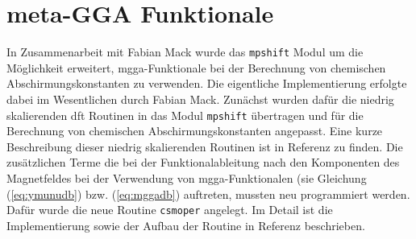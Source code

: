 \section{meta-GGA Funktionale}
In Zusammenarbeit mit Fabian Mack wurde das \texttt{mpshift} Modul um die Möglichkeit erweitert, \ac{mgga}-Funktionale bei der Berechnung von chemischen Abschirmungskonstanten zu verwenden. Die eigentliche Implementierung erfolgte dabei im Wesentlichen durch Fabian Mack. Zunächst wurden dafür die niedrig skalierenden \ac{dft} Routinen in das Modul \texttt{mpshift} übertragen und für die Berechnung von chemischen Abschirmungskonstanten angepasst. Eine kurze Beschreibung dieser niedrig skalierenden Routinen ist in Referenz \cite{deglmann2002efficient} zu finden. Die zusätzlichen Terme die bei der Funktionalableitung nach den Komponenten des Magnetfeldes bei der Verwendung von \ac{mgga}-Funktionalen (sie Gleichung (\ref{eq:ymunudb}) bzw. (\ref{eq:mggadb}) auftreten, mussten neu programmiert werden. Dafür wurde die neue Routine \texttt{csmoper} angelegt. Im Detail ist die Implementierung sowie der Aufbau der Routine in Referenz \cite{mack2017} beschrieben.
	
	